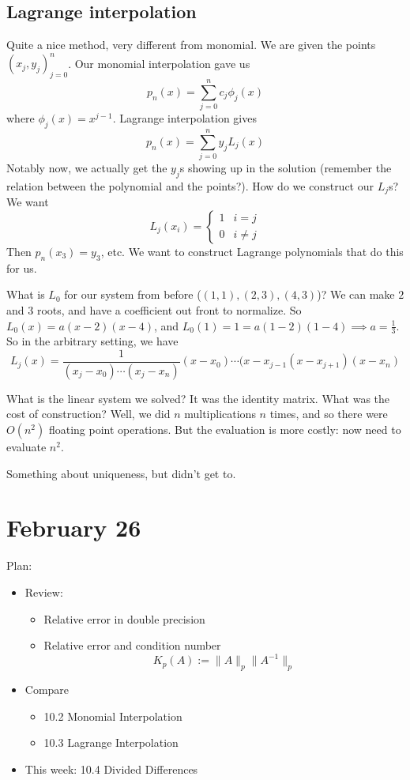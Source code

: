\documentclass{article}
\theoremstyle{plain}
\theoremstyle{remark}
\begin{document}
\subsection{Lagrange interpolation}
Quite a nice method, very different from monomial.
We are given the points $(x_j,y_j)_{j=0}^n$.
Our monomial interpolation gave us
\[
	p_n(x) = \sum_{j=0}^n c_j \phi_j(x)
\]
where $\phi_j(x) = x^{j-1}$.
Lagrange interpolation gives
\[
	p_n(x) = \sum_{j=0}^n y_j L_j(x)
\]
Notably now, we actually get the $y_j$s showing up in the solution
(remember the relation between the polynomial and the points?).
How do we construct our $L_j$s? We want
\[
	L_j(x_i) = \begin{cases} 1 & i = j \\ 0 & i \neq j \end{cases}
\]
Then $p_n(x_3) = y_3$, etc.
We want to construct Lagrange polynomials that do this for us.

What is $L_0$ for our system from before ($(1,1),(2,3),(4,3)$)?
We can make $2$ and $3$ roots, and have a coefficient out front to normalize.
So $L_0(x) = a(x-2)(x-4)$, and $L_0(1) = 1 = a(1-2)(1-4) \implies a = \frac13$.
So in the arbitrary setting, we have
\[
	L_j(x) = \frac{1}{(x_j - x_0)\cdots(x_j-x_n)}(x-x_0)\cdots (x - x_{j-1}
	(x - x_{j+1})(x-x_n)
\]

What is the linear system we solved?
It was the identity matrix.
What was the cost of construction?
Well, we did $n$ multiplications $n$ times,
and so there were $O(n^2)$ floating point operations.
But the evaluation is more costly: now need to evaluate $n^2$.

Something about uniqueness, but didn't get to.


\section{February 26}
Plan:
\begin{itemize}
	\item Review:
		\begin{itemize}
			\item Relative error in double precision
			\item Relative error and condition number
				\[
					K_p(A) := \lVert A \rVert_p \lVert A^{-1} \rVert_p
				\]
		\end{itemize}
	\item Compare
		\begin{itemize}
			\item 10.2 Monomial Interpolation
			\item 10.3 Lagrange Interpolation
		\end{itemize}
	\item This week: 10.4 Divided Differences
\end{itemize}
\end{document}
